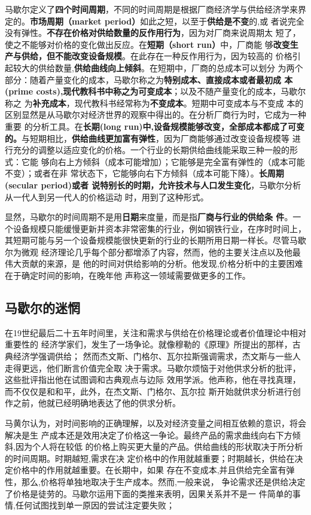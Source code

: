 马歇尔定义了\textbf{四个时间周期}，不同的时间周期是根据厂商经济学与供给经济学来界
定的。\textbf{市场周期（market period）}如此之短，以至于\textbf{供给是不变}的,或
者说完全没有弹性。\textbf{不存在价格对供给数量的反作用行为}，因为对厂商来说周期太
短了，使之不能够对价格的变化做出反应。在\textbf{短期（short run）}中，厂商能
够\textbf{改变生产与供给，但不能改变设备规模}。在此存在一种反作用行为，因为较高的
价格引起较大的供给数量,\textbf{供给曲线向上倾斜}。在短期中，厂商的总成本可以划分
为两个部分：随着产量变化的成本，马歇尔称之为\textbf{特别成本、直接成本或者最初成
  本(prime costs),现代教科书中称之为可变成本}；以及不随产量变化的成本，马歇尔称之
为\textbf{补充成本}，现代教科书经常称为\textbf{不变成本}。短期中可变成本与不变成
本的区别显然是从马歇尔对经济世界的观察中得出的。在分析厂商行为时，它成为一种重要
的分析工具。在\textbf{长期(long run)中,设备规模能够改变，全部成本都成了可变
  的。}与短期相比，\textbf{供给曲线更加富有弹性}，因为厂商能够通过改变设备规模等
进行充分的调整以适应变化的价格。一个行业的长期供给曲线能采取三种一般的形式：它能
够向右上方倾斜（成本可能增加）；它能够是完全富有弹性的（成本可能不变）；或者在非
常状态下，它能够向右下方倾斜（成本可能下降）。\textbf{长周期(secular period)或者
  说特别长的时期，允许技术与人口发生变化}，马歇尔分析从一代人到另一代人的价格运动
时，用到了这种形式。

显然，马歇尔的时间周期不是用\textbf{日期}来度量，而是指\textbf{厂商与行业的供给条
  件}。一个设备规模只能缓慢更新并资本非常密集的行业，例如钢铁行业，在序时时间上，
其短期可能与另一个设备规模能很快更新的行业的长期所用日期一样长。尽管马歇尔为微观
经济理论几乎每个部分都增添了内容，然而，他的主要关注点以及他最伟大贡献的来源，是
他的时间对供给影响的分析。他发现,价格分析中的主要困难在于确定时间的影响，在晚年他
声称这一领域需要做更多的工作。

\subsection{马歇尔的迷惘}

在19世纪最后二十五年时间里，关注和需求与供给在价格理论或者价值理论中相对重要性的
经济学家们，发生了一场争论。就像穆勒的《原理》所提出的那样，古典经济学强调供给；
然而杰文斯、门格尔、瓦尔拉斯强调需求，杰文斯与一些人走得更远，他们断言价值完全取
决于需求。马歇尔烦恼于对他供求分析的批评，这些批评指出他在试图调和古典观点与边际
效用学派。他声称，他在寻找真理，而不仅仅是和和平，此外，在杰文斯、门格尔、瓦尔拉
斯开始就供求分析进行创作之前，他就已经明确地表达了他的供求分析。

马黄尔认为，对时间影响的正确理解，以及对经济变量之间相互依赖的意识，将会解决是生
产成本还是效用决定了价格这一争论。最终产品的需求曲线向右下方倾斜,因为个人将在较低
的价格上购买更大量的产品。供给曲线的形状取决于所分析的时间周期。时期越短,需求在决
定价格中的作用就越重要；时期越长，供给在决定价格中的作用就越重要。在长期中，如果
存在不变成本,并且供给完全富有弹性，那么,价格将单独地取决于生产成本。然而,一般来说，
争论需求还是供给决定了价格是徒劳的。马歇尔运用下面的类推来表明，因果关系并不是一
件简单的事情,任何试图找到单一原因的尝试注定要失败；

